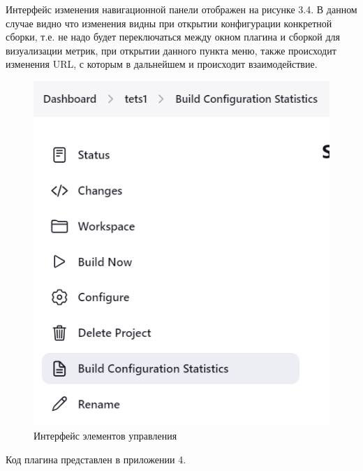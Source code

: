 Интерфейс изменения навигационной панели отображен на рисунке 3.4. В данном случае видно что изменения видны при открытии конфигурации конкретной сборки, т.е. не надо будет переключаться между окном плагина и сборкой для визуализации метрик, при открытии данного пункта меню, также происходит изменения URL, с которым в дальнейшем и происходит взаимодействие.

\begin{figure}[ht!] 
	\center
	\includegraphics [scale=0.47] {my_folder/images//ui3}
	\caption{Интерфейс элементов управления} 
	\label{fig:ArchitectureJenkins}  
\end{figure}



Код плагина представлен в приложении 4.
 






%
%

%
%







